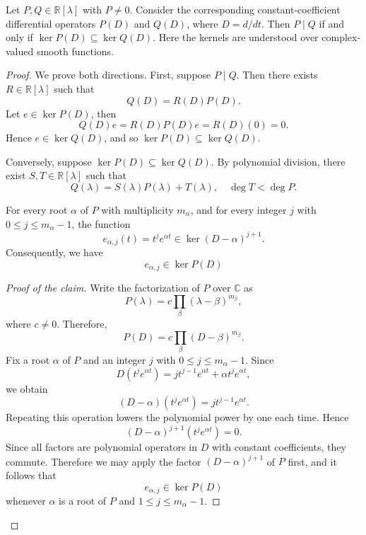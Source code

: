 ﻿\documentclass[12pt]{article}
\begin{document}
\begin{lemma}\label{lem:operator-kernel-inclusion}
Let $P, Q \in \mathbb R[\lambda]$ with $P \neq 0$. 
Consider the corresponding constant-coefficient differential operators $P(D)$ and $Q(D)$, where $D = d/dt$. 
Then
$P \mid Q$ if and only if $\ker P(D) \subseteq \ker Q(D)$. Here the kernels are understood over complex-valued smooth functions. 

\end{lemma}

\begin{proof}
We prove both directions.
First, suppose $P \mid Q$. Then there exists $R \in \mathbb R[\lambda]$ such that
\[
 Q(D) = R(D)P(D).
\]
Let $e \in \ker P(D)$, then
\[
 Q(D)e
 =
 R(D)P(D)e
 =
 R(D)(0)
 =
 0.
\]
Hence $e \in \ker Q(D)$, and so $\ker P(D) \subseteq \ker Q(D)$.

Conversely, suppose $\ker P(D) \subseteq \ker Q(D)$. By polynomial division, there exist $S, T \in \mathbb R[\lambda]$ such that
\begin{equation}\label{divi1}
 Q(\lambda) = S(\lambda)P(\lambda) + T(\lambda),
 \quad
 \deg T < \deg P.
\end{equation}


\begin{claim}\label{claim1}
For every root $\alpha$ of $P$ with multiplicity $m_\alpha$, and for every integer $j$ with $0\le j\le m_\alpha - 1$, the function
\[
 e_{\alpha, j}(t) = t^j e^{\alpha t} \in \ker(D - \alpha)^{j + 1}.
\]
Consequently, we have 
\[
 e_{\alpha, j} \in \ker P(D)
\]
\end{claim}

\begin{proof}[Proof of the claim]
Write the factorization of $P$ over $\mathbb C$ as
\[
 P(\lambda) = c\prod_{\beta}(\lambda - \beta)^{m_\beta},
\]
where $c \neq 0$. Therefore,
\[
 P(D) = c\prod_{\beta}(D - \beta)^{m_\beta}.
\]
Fix a root $\alpha$ of $P$ and an integer $j$ with $0\le j\le m_\alpha - 1$. 
Since
\[
 D(t^j e^{\alpha t})
 =
 jt^{j - 1}e^{\alpha t} + \alpha t^j e^{\alpha t},
\]
we obtain
\[
 (D - \alpha)(t^j e^{\alpha t})
 =
 jt^{j - 1}e^{\alpha t}.
\]
Repeating this operation lowers the polynomial power by one each time. Hence
\[
 (D - \alpha)^{j + 1}(t^j e^{\alpha t}) = 0.
\]
Since all factors are polynomial operators in $D$ with constant coefficients, they commute. Therefore we may apply the factor $(D - \alpha)^{j + 1}$ of $P$ first, and it follows that 
\[
 e_{\alpha, j} \in \ker P(D)
\]
whenever $\alpha$ is a root of $P$ and $1 \leq j \leq m_\alpha - 1$.
\end{proof}


\end{proof}
\end{document}
